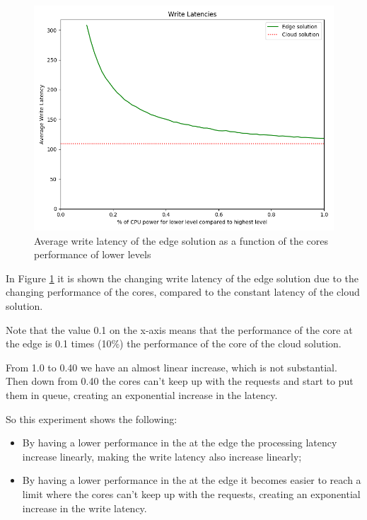 \begin{figure}[H]
    \centering
    \includegraphics[width=0.86\linewidth]{Figures/Evaluation/write-all-cpu-latency.png}
    \caption{Average write latency of the edge solution as a function of the cores performance of lower levels}
    \label{fig:/write-all-cpu-latency}
\end{figure}

In Figure \ref{fig:/write-all-cpu-latency} it is shown the changing write latency of the edge solution due to the changing performance of the  cores, compared to the constant latency of the cloud solution.

Note that the value 0.1 on the x-axis means that the performance of the core at the edge is 0.1 times (10\%) the performance of the core of the cloud solution.

From 1.0 to 0.40 we have an almost linear increase, which is not substantial. Then down from 0.40 the cores can't keep up with the requests and start to put them in queue, creating an exponential increase in the latency.

So this experiment shows the following:
\begin{itemize}
    \item By having a lower performance in the  at the edge the processing latency increase linearly, making the write latency also increase linearly;
    \item By having a lower performance in the  at the edge it becomes easier to reach a limit where the cores can't keep up with the requests, creating an exponential increase in the write latency.
\end{itemize}


